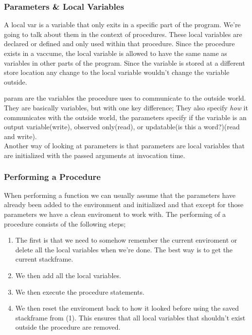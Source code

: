 \documentclass{article}
\begin{document}
    \subsubsection{Parameters \& Local Variables}
    A \gls{local var} is a variable that only exits in a specific part of the program. We're going to talk about them in the context of procedures.
    These local variables are declared or defined and only used within that procedure.
    Since the procedure exists in a vaccume, the local variable is allowed to have the same name as variables in other parts of the program. 
    Since the variable is stored at a different store location any change to the local variable wouldn't change the variable outside.

    \gls{param} are the variables the procedure uses to communicate to the outside world. They are basically variables, but with one key difference;
    They also specify \textit{how} it communicates with the outside world, the parameters specify if the variable is an output variable(write), observed only(read), or updatable(is this a word?)(read and write).\\
    Another way of looking at parameters is that parameters are local variables that are initialized with the passed arguments at invocation time.
    \subsubsection{Performing a Procedure}
        When performing a function we can usually assume that the parameters have already been added to the environment and initialized and that except for those parameters we have a clean
        enviroment to work with.
        The performing of a procedure consists of the following steps;
        \begin{enumerate}
            \item The first is that we need to somehow remember the current enviroment or delete all the local variables when we're done.
                The best way is to get the current \gls{stackframe}.
            \item We then add all the local variables.
            \item We then execute the procedure statements.
            \item We then reset the enviroment back to how it looked before using the saved stackframe from (1). This ensures that all local variables
                that shouldn't exist outside the procedure are removed. 
        \end{enumerate}
\end{document}
